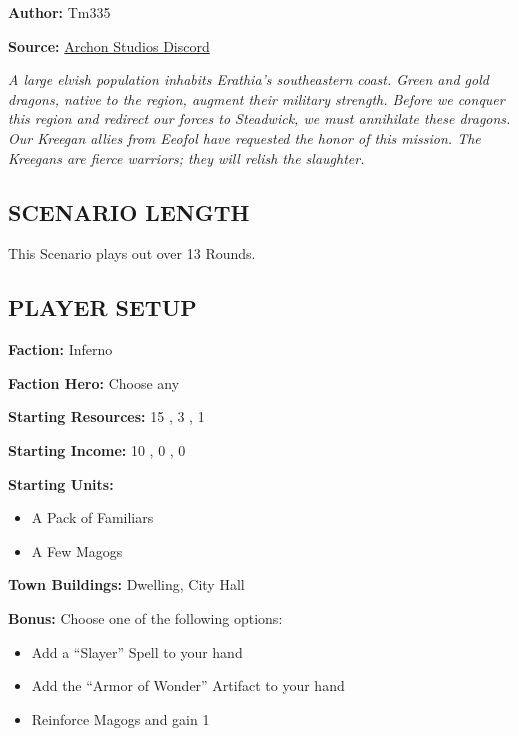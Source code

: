 \cleardoublepage{}

\begin{multicols*}{2}

\textbf{Author:} Tm335

\textbf{Source:} \href{https://discord.com/channels/740870068178649108/1243057664666238996/1243057664666238996}{Archon Studios Discord}

\textit{A large elvish population inhabits Erathia's southeastern coast.
Green and gold dragons, native to the region, augment their military strength.
Before we conquer this region and redirect our forces to Steadwick, we must annihilate these dragons.
Our Kreegan allies from Eeofol have requested the honor of this mission.
The Kreegans are fierce warriors; they will relish the slaughter.}

\subsection*{\MakeUppercase{Scenario Length}}

This Scenario plays out over 13 Rounds.

\subsection*{\MakeUppercase{Player Setup}}

\textbf{Faction:} Inferno

\textbf{Faction Hero:} Choose any

\textbf{Starting Resources:} 15 , 3 , 1 

\textbf{Starting Income:} 10 , 0 , 0 

\textbf{Starting Units:}

\begin{itemize}
  \item A Pack of Familiars
  \item A Few Magogs
\end{itemize}

\textbf{Town Buildings:}  Dwelling, City Hall

\textbf{Bonus:} Choose one of the following options:
\begin{itemize}
  \item Add a ``Slayer'' Spell to your hand
  \item Add the ``Armor of Wonder'' Artifact to your hand
  \item Reinforce Magogs and gain 1 
\end{itemize}


\end{multicols*}
